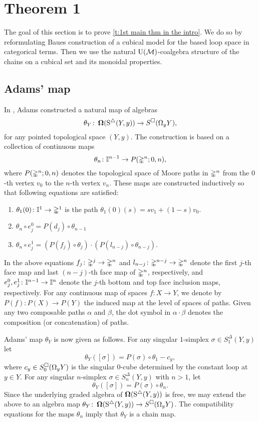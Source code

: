 
\section{Theorem 1}
The goal of this section is to prove \cref{t:1st main thm in the intro}. We do so by reformulating Baues construction of a cubical model for the based loop space in categorical terms. Then we use the natural ${\operatorname{U}(\mathcal{M})}$-coalgebra structure of the chains on a cubical set and its monoidal properties.


\subsection{Adams' map}

In \cite{adams1956cobar}, Adams constructed a natural map of algebras \begin{equation} \label{e:adams map 2}
\theta_Y \colon \operatorname{\mathbf{\Omega}}(\operatorname{S^{\triangle}}(Y, y)) \to S^{\square}(\Omega_y Y),
\end{equation}
for any pointed topological space $(Y,y)$.
The construction is based on a collection of continuous maps $$\theta_n \colon \mathbb{I}^{n-1} \to P(\mathbb{\Delta}^n;0,n),$$
where $P(\mathbb{\Delta}^n;0,n)$ denotes the topological space of Moore paths in $\mathbb{\Delta}^n$ from the $0$-th vertex $v_0$ to the $n$-th vertex $v_n$.
These maps are constructed inductively so that following equations are satisfied:
\begin{enumerate}
	\item $\theta_1(0)\colon \mathbb{I}^1 \to \mathbb{\Delta}^1$ is the path $\theta_1(0)(s) = sv_1 +(1-s)v_0$.
	\item
	 $\theta_n \circ e_j^0 = P(d_j) \circ \theta_{n-1}$
	\item
	 $\theta_n \circ e_j^1 = (P(f_j) \circ \theta_j) \cdot (P(l_{n-j}) \circ \theta_{n-j})$.
\end{enumerate}
In the above equations $f_j\colon \mathbb{\Delta}^j \rightarrow \mathbb{\Delta}^n$ and $l_{n-j}\colon \mathbb{\Delta}^{n-j} \rightarrow \mathbb{\Delta}^n$ denote the first $j$-th face map and last $(n-j)$-th face map of $\mathbb{\Delta}^n$, respectively, and
$e_j^0,e_j^1\colon \mathbb{I}^{n-1} \rightarrow \mathbb{I}^{n}$ denote the $j$-th bottom and top face inclusion maps, respectively.
For any continuous map of spaces $f\colon X \to Y$, we denote by $P(f) \colon P(X) \to P(Y)$ the induced map at the level of spaces of paths.
Given any two composable paths $\alpha$ and $\beta$, the dot symbol in $\alpha \cdot \beta$ denotes the composition (or concatenation) of paths.

Adams' map $\theta_Y$ is now given as follows.
For any singular $1$-simplex $\sigma \in S^{\Delta}_1(Y, y)$ let
$$\theta_Y([\sigma])= P(\sigma) \circ \theta_1 - c_y,$$
where $c_y \in S^{\square}_0(\Omega_y Y)$ is the singular $0$-cube determined by the constant loop at $y \in Y.$ For any singular $n$-simplex $\sigma \in S^{\Delta}_n(Y, y)$ with $n>1$, let
$$\theta_Y([\sigma])= P(\sigma) \circ \theta_n.$$ Since the underlying graded algebra of $\operatorname{\mathbf{\Omega}}(\operatorname{S^{\triangle}}(Y, y))$ is free, we may extend the above to an algebra map $\theta_Y \colon \operatorname{\mathbf{\Omega}}(\operatorname{S^{\triangle}}(Y, y)) \to S^{\square}(\Omega_y Y)$.
The compatibility equations for the maps $\theta_n$ imply that $\theta_Y$ is a chain map.

